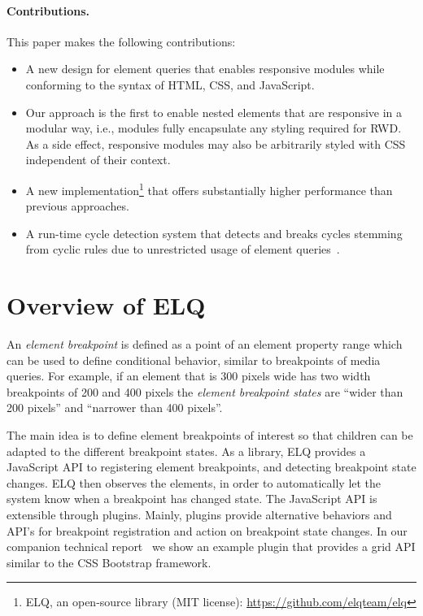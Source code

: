 \documentclass[sigconf,9pt]{acmart}
\newcommand{\elq}{ELQ}
\begin{document}
  \paragraph{Contributions.}
    This paper makes the following contributions:
    \begin{itemize}
      \item A new design for element queries that enables responsive modules while conforming to the syntax of HTML, CSS, and JavaScript.
      \item
        Our approach is the first to enable nested elements that are responsive in a modular way, i.e., modules fully encapsulate any styling required for RWD.
        As a side effect, responsive modules may also be arbitrarily styled with CSS independent of their context.
      \item
        A new implementation\footnote{ELQ, an open-source library (MIT license): \url{https://github.com/elqteam/elq}} that offers substantially higher performance than previous approaches.
      \item
        A run-time cycle detection system that detects and breaks cycles stemming from cyclic rules due to unrestricted usage of element queries~\cite{elq-thesis}.
    \end{itemize}

\section{Overview of \elq{}}\label{sec:elq}\label{sec:elq-api}
  An \emph{element breakpoint} is defined as a point of an element
  property range which can be used to define conditional behavior,
  similar to breakpoints of media queries.  For example, if an element
  that is 300 pixels wide has two width breakpoints of 200 and 400
  pixels the {\em element breakpoint states} are ``wider than 200
  pixels'' and ``narrower than 400 pixels''.

  The main idea is to define element breakpoints of interest so that children can be adapted to the different breakpoint states.
  As a library, \elq{} provides a JavaScript API to registering element breakpoints, and detecting breakpoint state changes.
  \elq{} then observes the elements, in order to automatically let the system know when a breakpoint has changed state.
  The JavaScript API is extensible through plugins.
  Mainly, plugins provide alternative behaviors and API's for breakpoint registration and action on breakpoint state changes.
  In our companion technical report~\cite{WienerEH15} we show an example plugin that provides a grid API similar to the CSS Bootstrap framework.
\end{document}
